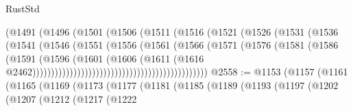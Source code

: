 \begin{lexlean}{RustStd}
\begin{coremodule}
                                              (@1491
                                                (@1496
                                                  (@1501
                                                    (@1506
                                                      (@1511
                                                        (@1516
                                                          (@1521
                                                            (@1526
                                                              (@1531
                                                                (@1536
                                                                  (@1541
                                                                    (@1546
                                                                      (@1551
                                                                        (@1556
                                                                          (@1561
                                                                            (@1566
                                                                              (@1571
                                                                                (@1576
                                                                                  (@1581
                                                                                    (@1586
                                                                                      (@1591
                                                                                        (@1596
                                                                                          (@1601
                                                                                            (@1606
                                                                                              (@1611
                                                                                                (@1616
                                                                                                  @2462)))))))))))))))))))))))))))))))))))))))))))))))
@2558 := @1153
    (@1157
      (@1161
        (@1165
          (@1169
            (@1173
              (@1177
                (@1181
                  (@1185
                    (@1189
                      (@1193
                        (@1197
                          (@1202
                            (@1207
                              (@1212
                                (@1217
                                  (@1222

\end{coremodule}
\end{lexlean}
